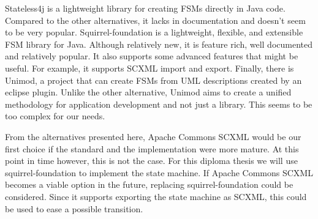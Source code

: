 Stateless4j is a lightweight library for creating FSMs directly in Java code.
Compared to the other alternatives, it lacks in documentation and doesn't seem to be very popular.
Squirrel-foundation is a lightweight, flexible, and extensible FSM library for Java.
Although relatively new, it is feature rich, well documented and relatively popular.
It also supports some advanced features that might be useful.
For example, it supports SCXML import and export.
Finally, there is Unimod, a project that can create FSMs from UML descriptions created by an eclipse plugin.
Unlike the other alternative, Unimod aims to create a unified methodology for application development and not just a library.
This seems to be too complex for our needs.

From the alternatives presented here, Apache Commons SCXML would be our first choice if the standard and the implementation were more mature.
At this point in time however, this is not the case.
For this diploma thesis we will use squirrel-foundation to implement the state machine.
If Apache Commons SCXML becomes a viable option in the future, replacing squirrel-foundation could be considered.
Since it supports exporting the state machine as SCXML, this could be used to ease a possible transition.
